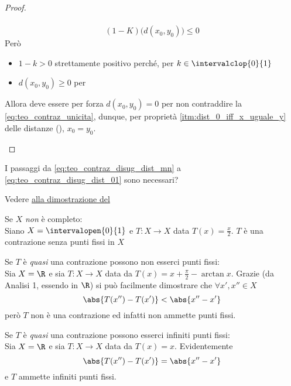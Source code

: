 \begin{theorem}
\begin{proof}
\begin{enumerate}
\begin{equation*}
\begin{gathered}
					\end{gathered}
				\end{equation*}
				\begin{equation}
					\label{eq:teo_contraz_unicita}
					(1-K) \bigl( d(x_0, y_0) \bigr) \leq 0
				\end{equation}
				Però
				\begin{itemize}
					\item $1-k > 0$ strettamente positivo perché, per  $k \in \intervalclop{0}{1}$
					\item $d(x_0, y_0) \geq 0$ per 
				\end{itemize}
				Allora deve essere per forza $d(x_0, y_0) = 0$ per non contraddire la \cref{eq:teo_contraz_unicita}, dunque, per proprietà \ref{itm:dist_0_iff_x_uguale_y} delle distanze (), $x_0 = y_0$.
		\end{enumerate}
	\end{proof}
\end{theorem}
\begin{exercise}
	I passaggi da \cref{eq:teo_contraz_disug_dist_mn} a \cref{eq:teo_contraz_disug_dist_01} sono necessari?
	\begin{solution}
		Vedere \hyperlink{note:teo_contraz_note}{\notestyle{} alla dimostrazione del }
	\end{solution}
\end{exercise}
\begin{example}
	Se $X$ \textit{non} è completo:\\
	Siano $X = \intervalopen{0}{1}$ e $T: X \to X$ data $T(x) = \frac{x}{2}$. $T$ è una contrazione senza punti fissi in $X$
\end{example}
\begin{example}
	Se $T$ è \textit{quasi} una contrazione possono non esserci punti fissi:\\
	Sia $X = \R$ e sia $T:X \to X$ data da $T(x) = x + \frac{\pi}{2} - \arctan x$. Grazie  (da Analisi 1, essendo in $\R$) si può facilmente dimostrare che $\forall x', x'' \in X$
	\[\abs{T(x'') - T(x')} < \abs{x'' - x'}\]
	però $T$ non è una contrazione ed infatti non ammette punti fissi.
\end{example}
\begin{example}
	Se $T$ è \textit{quasi} una contrazione possono esserci infiniti punti fissi:\\
	Sia $X = \R$ e sia $T:X \to X$ data da $T(x) = x$. Evidentemente
	\[\abs{T(x'') - T(x')} = \abs{x'' - x'}\]
	e $T$ ammette infiniti punti fissi.
\end{example}
